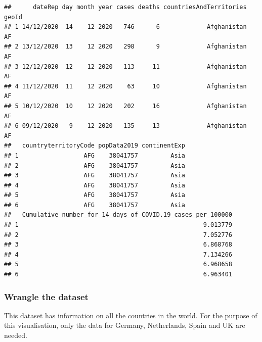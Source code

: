 \documentclass[
]{article}
\begin{document}
\begin{verbatim}
##      dateRep day month year cases deaths countriesAndTerritories geoId
## 1 14/12/2020  14    12 2020   746      6             Afghanistan    AF
## 2 13/12/2020  13    12 2020   298      9             Afghanistan    AF
## 3 12/12/2020  12    12 2020   113     11             Afghanistan    AF
## 4 11/12/2020  11    12 2020    63     10             Afghanistan    AF
## 5 10/12/2020  10    12 2020   202     16             Afghanistan    AF
## 6 09/12/2020   9    12 2020   135     13             Afghanistan    AF
##   countryterritoryCode popData2019 continentExp
## 1                  AFG    38041757         Asia
## 2                  AFG    38041757         Asia
## 3                  AFG    38041757         Asia
## 4                  AFG    38041757         Asia
## 5                  AFG    38041757         Asia
## 6                  AFG    38041757         Asia
##   Cumulative_number_for_14_days_of_COVID.19_cases_per_100000
## 1                                                   9.013779
## 2                                                   7.052776
## 3                                                   6.868768
## 4                                                   7.134266
## 5                                                   6.968658
## 6                                                   6.963401
\end{verbatim}

\subsubsection{Wrangle the dataset}\label{wrangle-the-dataset}

This dataset has information on all the countries in the world. For the
purpose of this visualisation, only the data for Germany, Netherlands,
Spain and UK are needed.
\end{document}
